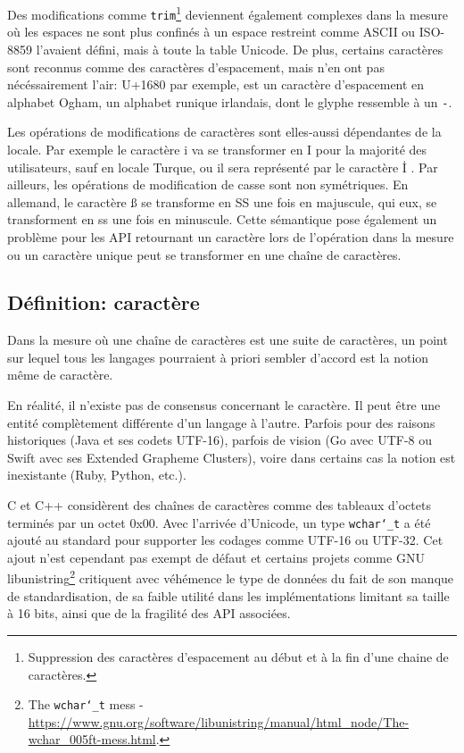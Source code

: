 Des modifications comme \texttt{trim}\footnote{Suppression des caractères d'espacement au début et à la fin d'une chaine de caractères.}
deviennent également complexes dans la mesure où les espaces ne sont
plus confinés à un espace restreint comme ASCII ou ISO-8859 l'avaient défini, mais à toute la table
Unicode.
De plus, certains caractères sont reconnus comme des caractères d'espacement, mais n'en ont pas
nécéssairement l'air: U+1680 par exemple, est un caractère d'espacement en alphabet Ogham, un alphabet runique
irlandais, dont le glyphe ressemble à un \texttt{-}.

Les opérations de modifications de caractères sont elles-aussi dépendantes de la locale.
Par exemple le caractère \og i \fg{} va se transformer en \og I \fg{} pour la majorité des utilisateurs,
sauf en locale Turque, ou il sera représenté par le caractère \og İ \fg{}.
Par ailleurs, les opérations de modification de casse sont non symétriques.
En allemand, le caractère \og ß \fg{} se transforme en \og SS \fg{} une fois en majuscule, qui eux, se transforment
en \og ss \fg{} une fois en minuscule.
Cette sémantique pose également un problème pour les API retournant un caractère lors de
l'opération dans la mesure ou un caractère unique peut se transformer en une chaîne de
caractères.

\subsection{Définition: caractère}

Dans la mesure où une chaîne de caractères est une suite de caractères,
un point sur lequel tous les langages pourraient à priori sembler
d'accord est la notion même de caractère.

En réalité, il n'existe pas de consensus concernant le caractère.
Il peut être une entité complètement différente d'un langage
à l'autre.
Parfois pour des raisons historiques (Java et ses codets UTF-16), parfois
de vision (Go avec UTF-8 ou Swift avec ses Extended Grapheme Clusters), voire dans
certains cas la notion est inexistante (Ruby, Python, etc.).

C et C++ considèrent des chaînes de caractères comme des
tableaux d'octets terminés par un octet 0x00.
Avec l'arrivée d'Unicode, un type \texttt{wchar\char`_t} a été ajouté au standard
pour supporter les codages comme UTF-16 ou UTF-32.
Cet ajout n'est cependant pas exempt de défaut et certains projets comme
GNU libunistring\footnote{The \texttt{wchar\char`_t} mess - \url{https://www.gnu.org/software/libunistring/manual/html_node/The-wchar_005ft-mess.html}.}
critiquent avec véhémence le type de données du fait de son manque de standardisation,
de sa faible utilité dans les implémentations limitant sa taille à 16 bits, ainsi que
de la fragilité des API associées.

